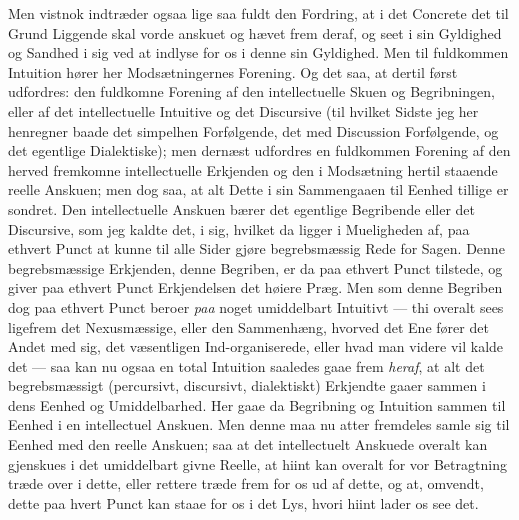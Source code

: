 \documentclass[12pt,a4paper]{book}
\newcommand{\apage}[1]{\marginnote{\footnotesize\textit{[#1]}}}
\begin{document}
Men vistnok indtræder ogsaa lige saa fuldt den Fordring, at i det Concrete
det til Grund Liggende skal vorde anskuet og hævet frem deraf, og seet i sin
Gyldighed og Sandhed i sig ved at indlyse for os i denne sin Gyldighed. Men
til fuldkommen Intuition hører her Modsætningernes Forening. Og det saa, at
dertil først udfordres: den fuldkomne Forening af den intellectuelle Skuen og
Begribningen, eller af det intellectuelle Intuitive og det Discursive (til
hvilket Sidste jeg her henregner baade det simpelhen Forfølgende, det med
Discussion Forfølgende, og det egentlige Dialektiske); men dernæst udfordres
en fuldkommen Forening af \apage{104} den herved fremkomne intellectuelle Erkjenden og
den i Modsætning hertil staaende reelle Anskuen; men dog saa, at alt Dette i
sin Sammengaaen til Eenhed tillige er sondret. Den intellectuelle Anskuen
bærer det egentlige Begribende eller det Discursive, som jeg kaldte det, i
sig, hvilket da ligger i Mueligheden af, paa ethvert Punct at kunne til alle
Sider gjøre begrebsmæssig Rede for Sagen. Denne begrebsmæssige Erkjenden,
denne Begriben, er da paa ethvert Punct tilstede, og giver paa ethvert Punct
Erkjendelsen det høiere Præg. Men som denne Begriben dog paa ethvert Punct
beroer \emph{paa} noget umiddelbart Intuitivt --- thi overalt sees ligefrem det
Nexusmæssige, eller den Sammenhæng, hvorved det Ene fører det Andet med sig,
det væsentligen Ind-organiserede, eller hvad man videre vil kalde det --- saa
kan nu ogsaa en total Intuition saaledes gaae frem \emph{heraf}, at alt det
begrebsmæssigt (percursivt, discursivt, dialektiskt) Erkjendte gaaer sammen i
dens Eenhed og Umiddelbarhed. Her gaae da Begribning og Intuition sammen til
Eenhed i en intellectuel Anskuen. Men denne maa nu atter fremdeles samle sig
til Eenhed med den reelle Anskuen; saa at det intellectuelt Anskuede overalt
kan gjenskues i det umiddelbart givne Reelle, at hiint kan overalt for vor
Betragtning træde over i dette, eller rettere træde frem for os ud af dette,
og at, omvendt, dette paa hvert Punct kan staae for os i det Lys, hvori hiint
lader os see det.
\end{document}
